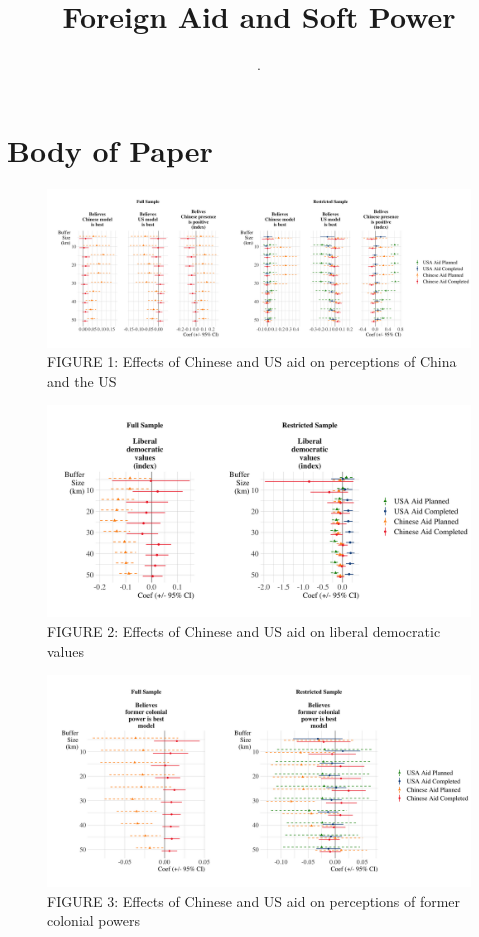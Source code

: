\documentclass[9pt]{article}
\title{Foreign Aid and Soft Power}
\author{.}
\begin{document}
\maketitle
\tableofcontents

\setlength{\tabcolsep}{5pt}


\newpage
\section{Body of Paper}

\begin{figure}[H]
\centering
\includegraphics[width=1\textwidth]{figures/figure_01.png}
\caption{FIGURE 1: Effects of Chinese and US aid on perceptions of China and the US}
\end{figure}

\begin{figure}[H]
\centering
\includegraphics[width=1\textwidth]{figures/figure_02.png}
\caption{FIGURE 2: Effects of Chinese and US aid on liberal democratic values}
\end{figure}

\begin{figure}[H]
\centering
\includegraphics[width=1\textwidth]{figures/figure_03.png}
\caption{FIGURE 3: Effects of Chinese and US aid on perceptions of former colonial powers}
\end{figure}
\end{document}
